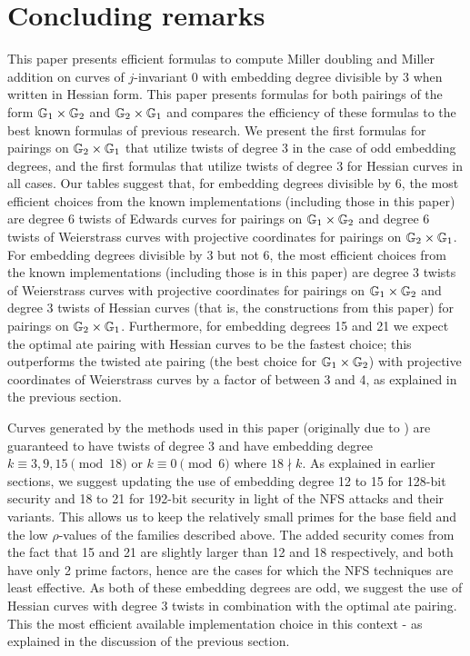 \section{Concluding remarks}
\label{sec:conclude}

This paper presents efficient formulas to compute Miller doubling and Miller addition on curves of $j$-invariant 0 with embedding degree divisible by 3 when written in Hessian form.
This paper presents formulas for both pairings of the form $\mathbb{G}_{1} \times \mathbb{G}_{2}$ and $\mathbb{G}_{2} \times \mathbb{G}_{1}$ and compares the efficiency of these formulas to the best known formulas of previous research.
We present the first formulas for pairings on $\mathbb{G}_{2} \times \mathbb{G}_{1}$ that utilize twists of degree 3 in the case of odd embedding degrees, and the first formulas that utilize twists of degree 3 for Hessian curves in all cases. Our tables suggest that, for embedding degrees divisible by 6, the most efficient choices from the known implementations (including those in this paper) are degree 6 twists of Edwards curves for pairings on $\mathbb{G}_{1} \times \mathbb{G}_{2}$ and degree 6 twists of Weierstrass curves with projective coordinates for pairings on $\mathbb{G}_{2} \times \mathbb{G}_{1}$.
For embedding degrees divisible by 3 but not 6, the most efficient choices from the 
known implementations (including those is in this paper) are degree 3 twists of Weierstrass curves with projective coordinates for pairings on $\mathbb{G}_{1} \times \mathbb{G}_{2}$ 
and degree 3 twists of Hessian curves (that is, the constructions from this paper) for pairings on $\mathbb{G}_{2} \times \mathbb{G}_{1}$. 
Furthermore, for embedding degrees 15 and 21 we expect the optimal ate pairing with Hessian curves to be the fastest choice; this outperforms
the twisted ate pairing (the best choice for $\mathbb{G}_{1} \times \mathbb{G}_{2}$) with projective coordinates of Weierstrass curves by a factor of between 3 and 4, as explained in the previous section.

Curves generated by the methods used in this paper (originally due to \cite{2010/freeman}) are guaranteed to have twists of degree $3$
and have embedding degree
$k \equiv 3,9,15 \pmod{18}$ or
$k \equiv 0 \pmod{6}$ where $18 \nmid k$.
As explained in earlier sections, we suggest updating the use of embedding degree 12 to 15 for 128-bit security and 18 to 21 for 192-bit security in light of the NFS attacks and their variants. This allows us to keep the relatively small primes for the base field and the low $\rho$-values of the families described above. The added security comes from the fact that 15 and 21 are slightly larger than 12 and 18 respectively, and both have only 2 prime factors, hence are the cases for which the NFS techniques are least effective. 
As both of these embedding degrees are odd, we suggest the use of Hessian curves with degree 3 twists in combination with the optimal ate pairing. 
This the most efficient available implementation choice in this context - as explained in the discussion of the previous section.

